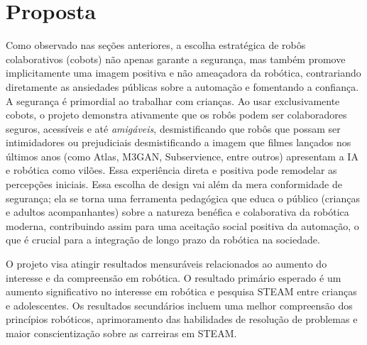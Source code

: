 \documentclass[%
  a4paper,%
  12pt,%
  fleqn,%
  english,%
  brazilian,%
]{article}
\begin{document}
\section{Proposta}
Como observado nas seções anteriores, a escolha estratégica de robôs colaborativos (cobots) não apenas garante a segurança, mas também promove implicitamente uma imagem positiva e não ameaçadora da robótica, contrariando diretamente as ansiedades públicas sobre a automação e fomentando a confiança. A segurança é primordial ao trabalhar com crianças. Ao usar exclusivamente cobots, o projeto demonstra ativamente que os robôs podem ser colaboradores seguros, acessíveis e até \emph{amigáveis}, desmistificando que robôs que possam ser intimidadores ou prejudiciais desmistificando a imagem que filmes lançados nos últimos anos (como Atlas, M3GAN, Subservience, entre outros) apresentam a IA e robótica como vilões. Essa experiência direta e positiva pode remodelar as percepções iniciais. Essa escolha de design vai além da mera conformidade de segurança; ela se torna uma ferramenta pedagógica que educa o público (crianças e adultos acompanhantes) sobre a natureza benéfica e colaborativa da robótica moderna, contribuindo assim para uma aceitação social positiva da automação, o que é crucial para a integração de longo prazo da robótica na sociedade.

O projeto visa atingir resultados mensuráveis relacionados ao aumento do interesse e da compreensão em robótica. O resultado primário esperado é um aumento significativo no interesse em robótica e pesquisa STEAM entre crianças e adolescentes. Os resultados secundários incluem uma melhor compreensão dos princípios robóticos, aprimoramento das habilidades de resolução de problemas e maior conscientização sobre as carreiras em STEAM.
\end{document}
